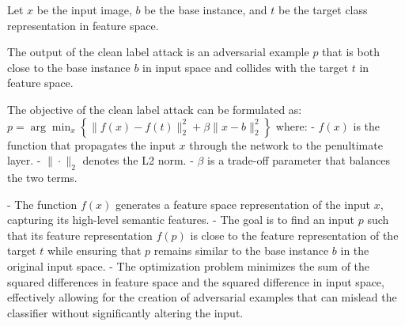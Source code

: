 Let $x$ be the input image, $b$ be the base instance, and $t$ be the target class representation in feature space.

The output of the clean label attack is an adversarial example $p$ that is both close to the base instance $b$ in input space and collides with the target $t$ in feature space.

The objective of the clean label attack can be formulated as:
$p = \arg\min_x \left\{ \|f(x) - f(t)\|_2^2 + \beta \|x - b\|_2^2 \right\}$
where:
- $f(x)$ is the function that propagates the input $x$ through the network to the penultimate layer.
- $\| \cdot \|_2$ denotes the L2 norm.
- $\beta$ is a trade-off parameter that balances the two terms.

- The function $f(x)$ generates a feature space representation of the input $x$, capturing its high-level semantic features.
- The goal is to find an input $p$ such that its feature representation $f(p)$ is close to the feature representation of the target $t$ while ensuring that $p$ remains similar to the base instance $b$ in the original input space.
- The optimization problem minimizes the sum of the squared differences in feature space and the squared difference in input space, effectively allowing for the creation of adversarial examples that can mislead the classifier without significantly altering the input.